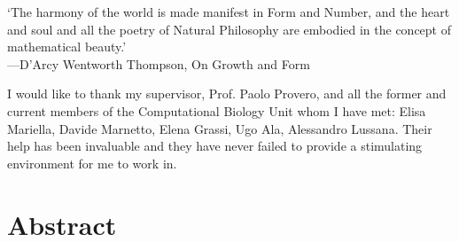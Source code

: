 \documentclass[a4paper,oneside,marginals=justified,nobib]{tufte-book}
\begin{document}
\cleardoublepage
\null{}
\begin{doublespace}
\noindent\fontsize{15}{15}\selectfont\itshape
\nohyphenation

`The harmony of the world is made manifest in Form and Number, and the 
heart and soul and all the poetry of Natural Philosophy are embodied in 
the concept of mathematical beauty.'\\
---D'Arcy Wentworth Thompson, \textnormal{On Growth and Form}


\noindent\fontsize{15}{15}\selectfont\itshape

I would like to thank my supervisor, Prof. Paolo Provero, and all the 
former and current members of the Computational Biology Unit whom I have 
met: Elisa Mariella, Davide Marnetto, Elena Grassi, Ugo Ala, Alessandro 
Lussana. Their help has been invaluable and they have never failed to 
provide a stimulating environment for me to work in.

\end{doublespace}
\null


\cleardoublepage
\chapter{Abstract} %
\end{document}
